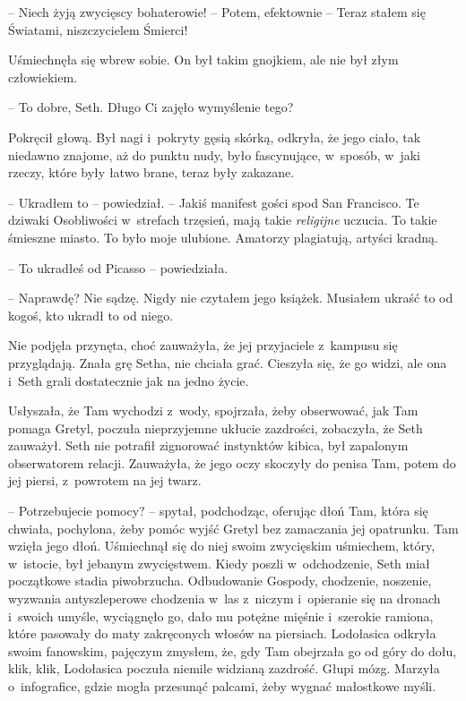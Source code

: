 \documentclass[oneside,polish,11pt,sfheadings]{mwbk}
\begin{document}
-- Niech żyją zwycięscy bohaterowie! -- Potem, efektownie -- Teraz stałem
się Światami, niszczycielem Śmierci!

Uśmiechnęła się wbrew sobie. On był takim gnojkiem, ale nie był złym
człowiekiem. 

-- To dobre, Seth. Długo Ci zajęło wymyślenie tego?

Pokręcił głową. Był nagi i~pokryty gęsią skórką, odkryła, że jego ciało,
tak niedawno znajome, aż do punktu nudy, było fascynujące, w~sposób, w~jaki rzeczy, które były łatwo brane, teraz były zakazane. 

-- Ukradłem to
-- powiedział. -- Jakiś manifest gości spod San Francisco. Te dziwaki
Osobliwości w~strefach trzęsień, mają takie \textit{religijne} uczucia. To
takie śmieszne miasto. To było moje ulubione. Amatorzy plagiatują,
artyści kradną.

-- To ukradłeś od Picasso -- powiedziała.

-- Naprawdę? Nie sądzę. Nigdy nie czytałem jego książek. Musiałem ukraść
to od kogoś, kto ukradł to od niego.

Nie podjęła przynęta, choć zauważyła, że jej przyjaciele z~kampusu się
przyglądają. Znała grę Setha, nie chciała grać. Cieszyła się, że go
widzi, ale ona i~Seth grali dostatecznie jak na jedno życie.

Usłyszała, że Tam wychodzi z~wody, spojrzała, żeby obserwować, jak Tam
pomaga Gretyl, poczuła nieprzyjemne ukłucie zazdrości, zobaczyła, że
Seth zauważył. Seth nie potrafił zignorować instynktów kibica, był
zapalonym obserwatorem relacji. Zauważyła, że jego oczy skoczyły do
penisa Tam, potem do jej piersi, z~powrotem na jej twarz.

-- Potrzebujecie pomocy? -- spytał, podchodząc, oferując dłoń Tam, która
się chwiała, pochylona, żeby pomóc wyjść Gretyl bez zamaczania jej
opatrunku. Tam wzięła jego dłoń. Uśmiechnął się do niej swoim zwycięskim
uśmiechem, który, w~istocie, był jebanym zwycięstwem. Kiedy poszli w~odchodzenie, Seth miał początkowe stadia piwobrzucha. Odbudowanie
Gospody, chodzenie, noszenie, wyzwania antyszleperowe chodzenia w~las z~niczym i~opieranie się na dronach i~swoich umyśle, wyciągnęło go, dało
mu potężne mięśnie i~szerokie ramiona, które pasowały do maty
zakręconych włosów na piersiach. Lodołasica odkryła swoim fanowskim,
pajęczym zmysłem, że, gdy Tam obejrzała go od góry do dołu, klik, klik,
Lodołasica poczuła niemile widzianą zazdrość. Głupi mózg. Marzyła o~infografice, gdzie mogła przesunąć palcami, żeby wygnać małostkowe
myśli.
\end{document}
